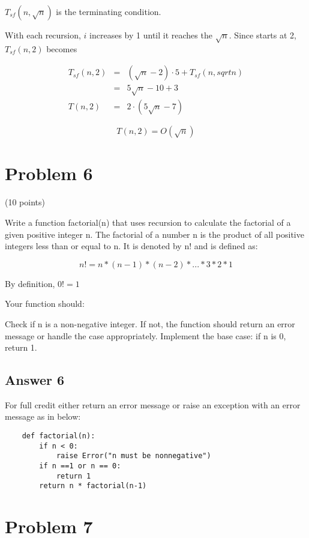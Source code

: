 \documentclass{article}
\begin{document}
\begin{enumerate}[label=(\alph*)]
$T_{sf}(n, \sqrt{n})$ is the terminating condition.

With each recursion, $i$ increases by 1 until it reaches the $\sqrt{n}$.
Since starts at 2, $T_{sf}(n, 2)$ becomes

\begin{eqnarray*}
  T_{sf}(n, 2) &=& (\sqrt{n}-2) \cdot 5 + T_{sf}(n, sqrt{n}) \\
  &=& 5\sqrt{n}-10 + 3 \\
  T(n, 2) &=& 2 \cdot (5\sqrt{n}-7)
\end{eqnarray*}

\begin{equation*}
  \boxed{T(n, 2) = O(\sqrt{n})}
\end{equation*}

\end{enumerate}

\section{Problem 6}

(10 points)

Write a function factorial(n) that uses recursion to calculate the
factorial of a given positive integer n. The factorial of a number n
is the product of all positive integers less than or equal to n. It is
denoted by n! and is defined as:

\[
n! = n * (n-1) * (n-2) * ... * 3 * 2 * 1
\]

By definition, $0! = 1$

Your function should:

Check if n is a non-negative integer. If not, the function should return an error message or handle the case appropriately.
Implement the base case: if n is 0, return 1.

\subsection*{Answer 6}

For full credit either return an error message or raise an exception
with an error message as in below:

\begin{verbatim}
    def factorial(n):
        if n < 0:
            raise Error("n must be nonnegative")
        if n ==1 or n == 0:
            return 1
        return n * factorial(n-1)
\end{verbatim}


\section{Problem 7}
\end{document}
